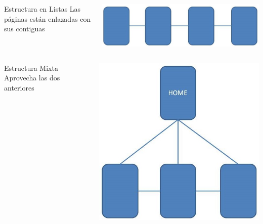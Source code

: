 \documentclass{beamer}
\begin{document}
\begin{frame}
  \begin{columns}[c]
	\begin{block}{Estructura en Listas}
	Las páginas están enlazadas con sus contiguas
	\end{block}

	\begin{center}
	\includegraphics[scale=.3]{images/EstructuraListas.JPG} 
	\end{center}
  \end{columns}
\end{frame}

\begin{frame}
  \begin{columns}[c]
	\begin{block}{Estructura Mixta}
	Aprovecha las dos anteriores
	\end{block}

	\begin{center}
	\includegraphics[scale=.3]{images/EstructuraMixta.JPG} 
	\end{center}
  \end{columns}
\end{frame}
\end{document}
